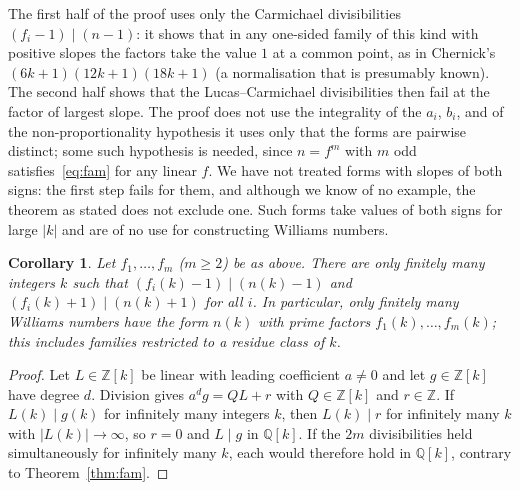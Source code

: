\documentclass[11pt]{amsart}
\newtheorem{corollary}[theorem]{Corollary}
\theoremstyle{definition}
\theoremstyle{remark}
\begin{document}
The first half of the proof uses only the Carmichael divisibilities $(f_i-1)\mid(n-1)$: it shows that in any one-sided family of this kind with positive slopes the factors take the value $1$ at a common point, as in Chernick's $(6k+1)(12k+1)(18k+1)$ (a normalisation that is presumably known). The second half shows that the Lucas--Carmichael divisibilities then fail at the factor of largest slope. The proof does not use the integrality of the $a_i$, $b_i$, and of the non-proportionality hypothesis it uses only that the forms are pairwise distinct; some such hypothesis is needed, since $n=f^m$ with $m$ odd satisfies~\eqref{eq:fam} for any linear $f$. We have not treated forms with slopes of both signs: the first step fails for them, and although we know of no example, the theorem as stated does not exclude one. Such forms take values of both signs for large $|k|$ and are of no use for constructing Williams numbers.

\begin{corollary}\label{cor:fam}
Let $f_1,\dots,f_m$ ($m\ge2$) be as above. There are only finitely many integers $k$ such that $(f_i(k)-1)\mid(n(k)-1)$ and $(f_i(k)+1)\mid(n(k)+1)$ for all $i$. In particular, only finitely many Williams numbers have the form $n(k)$ with prime factors $f_1(k),\dots,f_m(k)$; this includes families restricted to a residue class of $k$.
\end{corollary}
\begin{proof}
Let $L\in\mathbb Z[k]$ be linear with leading coefficient $a\ne0$ and let $g\in\mathbb Z[k]$ have degree $d$. Division gives $a^dg=QL+r$ with $Q\in\mathbb Z[k]$ and $r\in\mathbb Z$. If $L(k)\mid g(k)$ for infinitely many integers $k$, then $L(k)\mid r$ for infinitely many $k$ with $|L(k)|\to\infty$, so $r=0$ and $L\mid g$ in $\mathbb Q[k]$. If the $2m$ divisibilities held simultaneously for infinitely many $k$, each would therefore hold in $\mathbb Q[k]$, contrary to Theorem~\ref{thm:fam}.
\end{proof}
\end{document}
